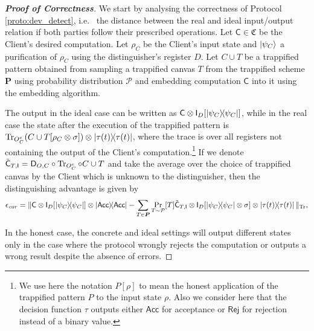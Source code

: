 \documentclass[12pt]{iopart}
\newcommand{\cptp}[1]{\mathsf{#1}} \newcommand{\pd}[1]{\mathcal{#1}}  \newcommand{\sch}[1]{\bm{#1}}
\newcommand{\Id}{\cptp{I}}
\renewcommand{\1}{\mathds{1}}
\newcommand{\acc}{\mathsf{Acc}}
\newcommand{\rej}{\mathsf{Rej}}
\newcommand{\TP}{C\cup T}
\newcommand{\Deco}{\cptp D_{O, C}}
\newcommand{\Cdev}[1]{\tilde{\cptp C}_{T, #1}}
\begin{document}
\begin{proof}[\bf Proof of Correctness]
We start by analysing the correctness of Protocol \ref{proto:dev_detect}, i.e.~ the distance between the real and ideal input/output relation if both parties follow their prescribed operations. Let $\cptp C \in \mathfrak C$ be the Client's desired computation. Let $\rho_C$ be the Client's input state and $\ket{\psi_C}$ a purification of $\rho_C$ using the distinguisher's register $D$. Let $\TP$ be a trappified pattern obtained from sampling a trappified canvas $T$ from the trappified scheme $\sch P$ using probability distribution $\pd P$ and embedding computation $\cptp C$ into it using the embedding algorithm.

The output in the ideal case can be written as $\cptp C \otimes \Id_D[\dyad{\psi_C}]$, while in the real case the state after the execution of the trappified pattern is $\Tr_{O_C^c}(\TP[\rho_C\otimes\sigma])\otimes\dyad{\tau(t)}$, where the trace is over all registers not containing the output of the Client's computation.\footnote{We use here the notation $P[\rho]$ to mean the honest application of the trappified pattern $P$ to the input state $\rho$. Also we consider here that the decision function $\tau$ outputs either $\acc$ for acceptance or $\rej$ for rejection instead of a binary value.} If we denote $\Cdev{\Id} = \Deco\circ\Tr_{O_C^c}\circ \TP$ and take the average over the choice of trappified canvas by the Client which is unknown to the distinguisher, then the distinguishing advantage is given by
\begin{align}
	\epsilon_{\mathit{cor}} = \| \cptp C \otimes \Id_D[\dyad{\psi_C}]\otimes\dyad{\acc} - \sum_{T\in \sch P} \Pr_{T\sim \pd P}[T] \Cdev{\Id} \otimes \Id_D[\dyad{\psi_C}\otimes\sigma]\otimes\dyad{\tau(t)}\|_{\Tr},
\end{align}

In the honest case, the concrete and ideal settings will output different states only in the case where the protocol wrongly rejects the computation or outputs a wrong result despite the absence of errors.


\end{proof}
\end{document}
